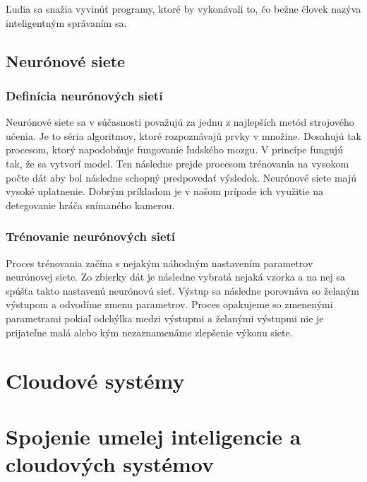 \documentclass[10pt,twoside,slovak,coursepaper]{article}
\begin{document}
Ľudia sa snažia vyvinúť programy, ktoré by vykonávali to, čo bežne človek nazýva inteligentným správaním sa.
\subsection{Neurónové siete} \label{Neuronove_siete}
\subsubsection{Definícia neurónových sietí} \label{Neuronove_siete_1}
Neurónové siete sa v súčasnosti považujú za jednu z najlepších metód strojového učenia. Je to séria algoritmov, ktoré rozpoznávajú prvky v množine. Dosahujú tak procesom, ktorý napodobňuje fungovanie ľudského mozgu. V princípe fungujú tak, že sa vytvorí model. Ten následne prejde procesom trénovania na vysokom počte dát aby bol následne schopný predpovedať výsledok. Neurónové siete majú vysoké uplatnenie. Dobrým príkladom je v našom prípade ich využitie na detegovanie hráča snímaného kamerou.

\subsubsection{Trénovanie neurónových sietí} \label{Neuronove_siete_2}
Proces trénovania začína s nejakým náhodným nastavením parametrov neurónovej siete. Zo zbierky dát je následne vybratá nejaká vzorka a na nej sa spúšťa takto nastavenú neurónovú sieť. Výstup sa následne porovnáva so želaným výstupom a odvodíme zmenu parametrov. Proces opakujeme so zmenenými parametrami pokiaľ odchýlka medzi výstupmi a želanými výstupmi nie je prijateľne malá alebo kým nezaznamenáme zlepšenie výkonu siete. 
	

\section{Cloudové systémy} \label{Cloudové_systémy}

\section{Spojenie umelej inteligencie a cloudových systémov} \label{Zaver}



\end{document}
